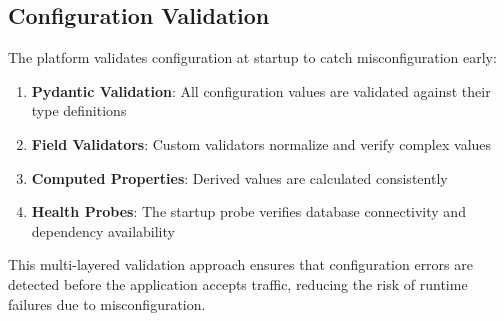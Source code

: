 \subsection{Configuration Validation}

The platform validates configuration at startup to catch misconfiguration early:

\begin{enumerate}
    \item \textbf{Pydantic Validation}: All configuration values are validated against their type definitions
    \item \textbf{Field Validators}: Custom validators normalize and verify complex values
    \item \textbf{Computed Properties}: Derived values are calculated consistently
    \item \textbf{Health Probes}: The startup probe verifies database connectivity and dependency availability
\end{enumerate}

This multi-layered validation approach ensures that configuration errors are detected before the application accepts traffic, reducing the risk of runtime failures due to misconfiguration.

